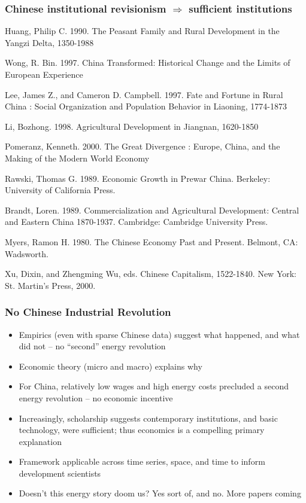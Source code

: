 \documentclass[final]{beamer}
\begin{document}
\begin{frame}
\frametitle{Chinese institutional revisionism $\Rightarrow$ sufficient institutions}
\begin{itemize}
\footnotesize{
\item Huang, Philip C. 1990. The Peasant Family and Rural Development in the Yangzi Delta, 1350-1988
\item Wong, R. Bin. 1997. China Transformed: Historical Change and the Limits of European Experience
\item Lee, James Z., and Cameron D. Campbell. 1997. Fate and Fortune in Rural China : Social Organization and Population Behavior in Liaoning, 1774-1873
\item Li, Bozhong. 1998. Agricultural Development in Jiangnan, 1620-1850
\item Pomeranz, Kenneth. 2000. The Great Divergence : Europe, China, and the Making of the Modern World Economy
\item Rawski, Thomas G. 1989. Economic Growth in Prewar China. Berkeley: University of California Press.
\item Brandt, Loren. 1989. Commercialization and Agricultural Development: Central and Eastern China 1870-1937. Cambridge: Cambridge University Press.
\item Myers, Ramon H. 1980. The Chinese Economy Past and Present. Belmont, CA: Wadsworth.
\item Xu, Dixin, and Zhengming Wu, eds. Chinese Capitalism, 1522-1840. New York: St. Martin's Press, 2000. 
}
\end{itemize}
\end{frame}

\begin{frame}
\frametitle{No Chinese Industrial Revolution}

	\begin{itemize}
	\item Empirics (even with sparse Chinese data) suggest what happened, and what did not -- no ``second'' energy revolution \pause
	\item Economic theory (micro and macro) explains why \pause
	\item For China, relatively low wages and high energy costs precluded a second energy revolution -- no economic incentive \pause
	\item Increasingly, scholarship suggests contemporary institutions, and basic technology, were sufficient\pause; thus economics is a compelling primary explanation \pause
	\item Framework applicable across time series, space, and time to inform development scientists
	\item Doesn't this energy story doom us? \pause Yes sort of, and no. More papers coming
	\end{itemize}
\end{frame}
\end{document}

